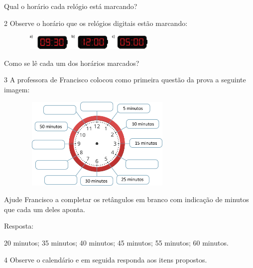 \begin{escolha}
Qual o horário cada relógio está marcando?


\num{2} Observe o horário que os relógios digitais estão marcando:


\includegraphics[width=3.54197in,height=0.29169in]{media/image52.png}

Como se lê cada um dos horários marcados?


\num{3} A professora de Francisco colocou como primeira questão da prova a seguinte imagem:


\includegraphics[width=3.90034in,height=1.75015in]{media/image53.png}

Ajude Francisco a completar os retângulos em branco com indicação de
minutos que cada um deles aponta.

Resposta:

20 minutos; 35 minutos; 40 minutos; 45 minutos; 55 minutos; 60 minutos.

\num{4} Observe o calendário e em seguida responda aos itens propostos.



\end{escolha}
